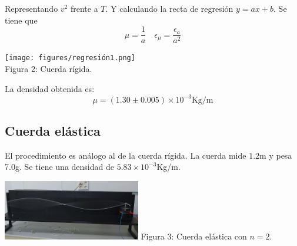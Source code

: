 \documentclass{article}
\begin{document}
\begin{multicols}{2}
Representando $v^2$ frente a $T$. Y calculando la recta de regresión $y = ax+b$. Se tiene que
$$
\mu = \frac{1}{a} \quad \epsilon_{\mu} = \frac{\epsilon_a}{a^2}
$$
\begin{center}
  \texttt{[image: figures/regresión1.png]}\\
  Figura 2: Cuerda rígida.
\end{center}
La densidad obtenida es:
$$
\mu = (1.30\pm0.005)\times 10^{-3}\text{Kg/m}
$$

\subsection*{Cuerda elástica}
El procedimiento es análogo al de la cuerda rígida. La cuerda mide $1.2$m y pesa 7.0g. Se tiene una densidad de $5.83\times10^{-3}$Kg/m.
\begin{center}
  \includegraphics[width=0.45\textwidth]{figures/n2.png}
  Figura 3: Cuerda elástica con $n=2$.
\end{center}
\end{multicols}
\end{document}
